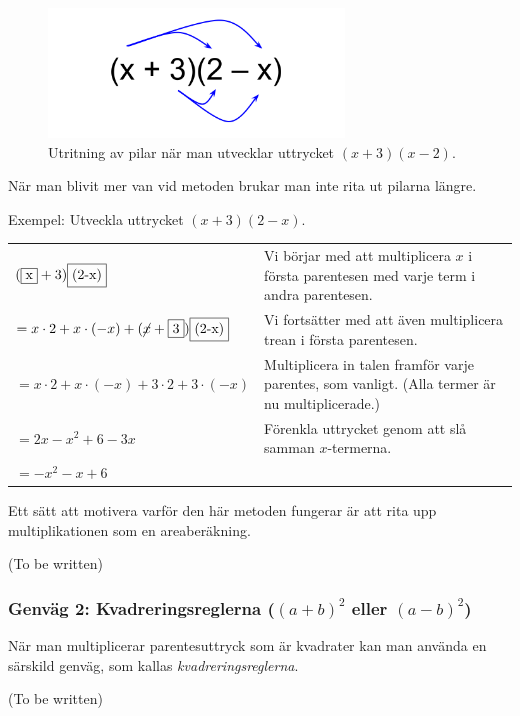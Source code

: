 \begin{figure}
  \centering
  \includegraphics[width=0.7\textwidth]{bilder/parentesmultiplikation.svg}
  \caption{\label{fig:parentesmultiplikation}Utritning av pilar när man utvecklar uttrycket $(x+3)(x-2)$.}
\end{figure}

När man blivit mer van vid metoden brukar man inte rita ut pilarna längre.

Exempel: Utveckla uttrycket $(x+3)(2-x)$.

\smallskip
\begin{tabular}{l|p{5.7cm}}
  $(\framebox{x}+3)\framebox{(2-x)}$ & Vi börjar med att multiplicera $x$ i första parentesen med varje term i andra parentesen. \\
  $= x \cdot 2 + x \cdot (-x) + (\cancel{x} + \framebox{3})\framebox{(2-x)}$ &  Vi fortsätter med att även multiplicera trean i första parentesen. \\
  $= x \cdot 2 + x \cdot (-x) + 3 \cdot 2 + 3 \cdot (-x)$ & Multiplicera in talen framför varje parentes, som vanligt. (Alla termer är nu multiplicerade.) \\
  $= 2x - x^2 + 6 - 3x$ & Förenkla uttrycket genom att slå samman $x$-termerna. \\
  $=-x^2 - x + 6$ & \\
\end{tabular}
\smallskip

Ett sätt att motivera varför den här metoden fungerar är att rita upp multiplikationen som en areaberäkning.

(To be written)

\subsubsection{Genväg 2: Kvadreringsreglerna ($(a+b)^2$ eller $(a-b)^2$)}

När man multiplicerar parentesuttryck som är kvadrater kan man använda en särskild genväg, som kallas \emph{kvadreringsreglerna}.

(To be written)


